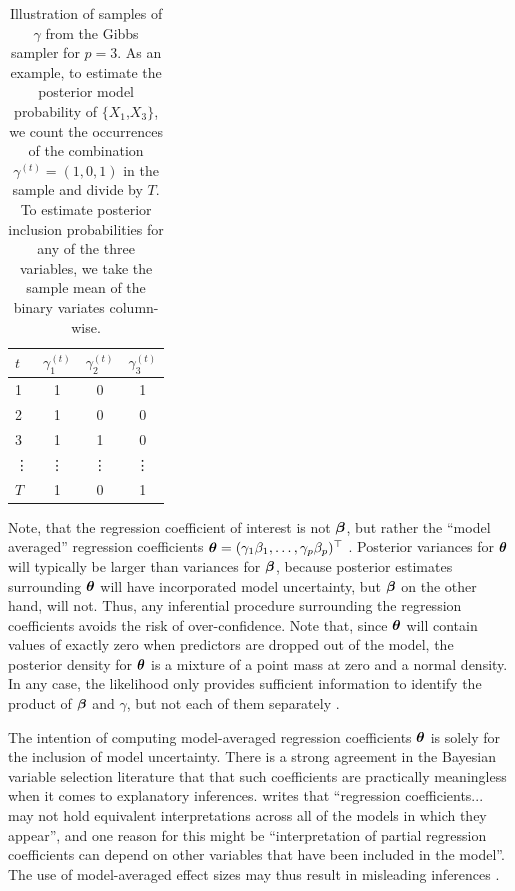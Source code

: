 \documentclass[11pt,twoside,openright]{report}
\begin{document}
\begin{table}[hbt]
  \centering  
  \caption[Illustration of samples of $\gamma$ from the Gibbs sampler]{Illustration of samples of $\gamma$ from the Gibbs sampler for $p=3$. As an example, to estimate the posterior model probability of $\{X_1$,$X_3\}$, we count the occurrences of the combination $\gamma^{(t)}=(1,0,1)$ in the sample and divide by $T$. To estimate posterior inclusion probabilities for any of the three variables, we take the sample mean of the binary variates column-wise.}
  \begin{tabular}{lccc}
    \toprule
    $t$ &$\gamma_1^{(t)}$ &$\gamma_2^{(t)}$ &$\gamma_3^{(t)}$ \\
    \midrule
    1  &1 &0 &1 \\
    2  &1 &0 &0 \\
    3  &1 &1 &0 \\
    \vdots &\vdots &\vdots &\vdots \\
    $T$  &1 &0 &1 \\
    \bottomrule
  \end{tabular}
\end{table}

Note, that the regression coefficient of interest is not ${\bm\beta}$, but rather the ``model averaged'' regression coefficients ${\bm\theta} = (\gamma_1\beta_1,\dots,\gamma_p\beta_p)^\top$ \citep{madigan1994model}.
Posterior variances for ${\bm\theta}$ will typically be larger than variances for ${\bm\beta}$, because posterior estimates surrounding ${\bm\theta}$ will have incorporated model uncertainty, but ${\bm\beta}$ on the other hand, will not.
Thus, any inferential procedure surrounding the regression coefficients avoids the risk of over-confidence.
Note that, since ${\bm\theta}$ will contain values of exactly zero when predictors are dropped out of the model, the posterior density for ${\bm\theta}$ is a mixture of a point mass at zero and a normal density.
In any case, the likelihood only provides sufficient information to identify the product of ${\bm\beta}$ and $\gamma$, but not each of them separately \citep{Kuo1998}.

\label{errata19}
\begin{remark}
  The intention of computing model-averaged regression coefficients ${\bm\theta}$ is solely for the inclusion of model uncertainty.  
  There is a strong agreement in the Bayesian variable selection literature that that such coefficients are practically meaningless when it comes to explanatory inferences.
  \citet{banner2017considerations} writes that ``regression coefficients... may not hold equivalent interpretations across all of the models in which they appear'', and one reason for this might be ``interpretation of partial regression coefficients can depend on other variables that have been included in the model''.
  The use of model-averaged effect sizes may thus result in misleading inferences \citep{cade2015model}.
\end{remark}
\end{document}
